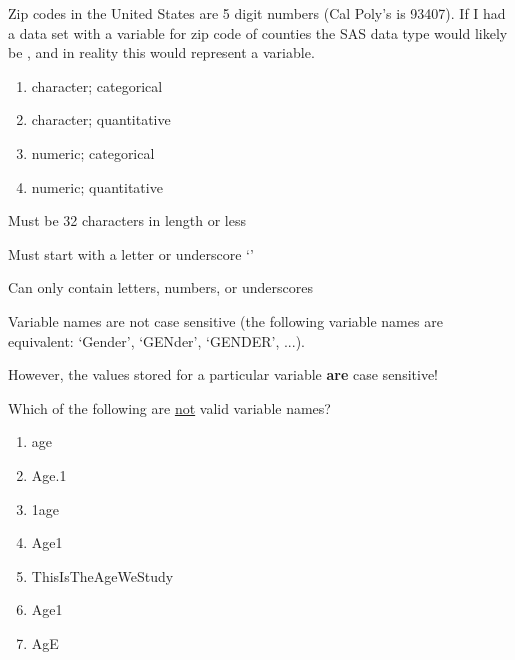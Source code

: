 \begin{frame}
\begin{clicker}{Zip codes in the United States are 5 digit numbers (Cal Poly's is 93407).  If I had a data set with a variable for zip code of counties the SAS data type would likely be \underline{\hspace{1in}}, and in reality this would represent a \underline{\hspace{1in}} variable.}
\begin{enumerate}
    \item character; categorical
    \item character; quantitative
    \item numeric; categorical
    \item numeric; quantitative
\end{enumerate}
\end{clicker}
\end{frame}


\begin{frame}
\bi
\item Must be 32 characters in length or less
\item Must start with a letter or underscore `\ttt{\myuscore}'
\item Can only contain letters, numbers, or underscores
\item Variable names are not case sensitive (the following variable names are equivalent: `Gender', `GENder', `GENDER', ...).
\item However, the values stored for a particular variable \textbf{are} case sensitive!
\ei
\end{frame}

\begin{frame}
\begin{clicker}{Which of the following are \underline{not} valid variable names?}
\begin{enumerate}
    \item \ttt{\myuscore}age
    \item Age.1
    \item 1age
    \item Age1
    \item ThisIsTheAgeWeStudy
    \item Age\ttt{\myuscore}1
    \item AgE
\end{enumerate}
\end{clicker}
\end{frame}

